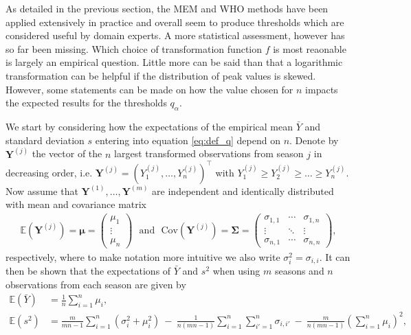 \documentclass{article}
\newcommand{\sd}{s}
\newcommand{\mean}{\bar{Y}}
\begin{document}
As detailed in the previous section, the MEM and WHO methods have been applied extensively in practice and overall seem to produce thresholds which are considered useful by domain experts. A more statistical assessment, however has so far been missing. Which choice of transformation function $f$ is most reaonable is largely an empirical question. Little more can be said than that a logarithmic transformation can be helpful if the distribution of peak values is skewed. However, some statements can be made on how the value chosen for $n$ impacts the expected results for the thresholds $q_\alpha$.

We start by considering how the expectations of the empirical mean $\mean$ and standard deviation $\sd$ entering into equation \eqref{eq:def_q} depend on $n$. Denote by $\mathbf{Y}^{(j)}$ the vector of the $n$ largest transformed observations from season $j$ in decreasing order, i.e. $\mathbf{Y}^{(j)} = (Y^{(j)}_1, \dots, Y^{(j)}_n)^\top$ with $Y^{(j)}_1 \geq Y^{(j)}_2 \geq \dots \geq Y^{(j)}_n$. Now assume that $\mathbf{Y}^{(1)}, \dots, \mathbf{Y}^{(m)}$ are independent and identically distributed with mean and covariance matrix
\begin{align}
\mathbb{E}\left(\mathbf{Y}^{(j)}\right) = \boldsymbol{\mu} = \left(\begin{array}{c}
\mu_1\\
\vdots\\
\mu_n
\end{array}\right) \ \ \ \text{and} \ \ \ \text{Cov}\left(\mathbf{Y}^{(j)}\right) = \boldsymbol{\Sigma} =
\left(\begin{array}{ccc}
\sigma_{1, 1} & \cdots & \sigma_{1, n}\\
\vdots & \ddots &\vdots\\
\sigma_{n, 1} & \cdots & \sigma_{n, n}
\end{array}\right),
\end{align}
respectively, where to make notation more intuitive we also write $\sigma^2_i = \sigma_{i, i}$. It can then be shown that the expectations of $\mean$ and $\sd^2$ when using $m$ seasons and $n$ observations from each season are given by
\begin{align}
\mathbb{E}(\mean) & = \frac{1}{n} \sum_{i = 1}^n \mu_i,
\label{eq:expectation_mu}\\
\mathbb{E}(\sd^2) & = \frac{m}{mn - 1} \sum_{i = 1}^n (\sigma_{i}^2 + \mu_i^2) \ - \ \frac{1}{n(mn - 1)} \sum_{i = 1}^n \sum_{i' = 1}^n \sigma_{i,i'} \ - \ \frac{m}{n(mn - 1)}\left(\sum_{i = 1}^n \mu_i\right)^2,
\label{eq:expectation_sigma2}
\end{align}
\end{document}

